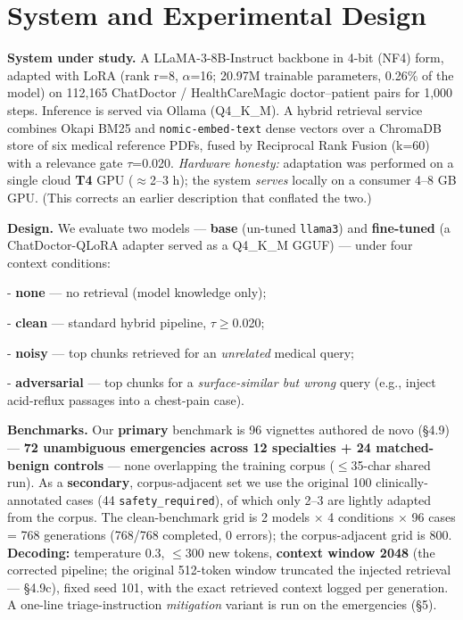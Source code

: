 \documentclass[11pt]{article}
\begin{document}
\section{System and Experimental Design}

\textbf{System under study.} A LLaMA-3-8B-Instruct backbone in 4-bit (NF4) form, adapted with LoRA (rank r=8, \(\alpha\)=16; 20.97M trainable parameters, 0.26\% of the model) on 112,165 ChatDoctor / HealthCareMagic doctor--patient pairs for 1,000 steps. Inference is served via Ollama (Q4\_K\_M). A hybrid retrieval service combines Okapi BM25 and \texttt{nomic-embed-text} dense vectors over a ChromaDB store of six medical reference PDFs, fused by Reciprocal Rank Fusion (k=60) with a relevance gate \(\tau\)=0.020. \textit{Hardware honesty:} adaptation was performed on a single cloud \textbf{T4} GPU (\(\approx\)2--3 h); the system \textit{serves} locally on a consumer 4--8 GB GPU. (This corrects an earlier description that conflated the two.)


\textbf{Design.} We evaluate two models --- \textbf{base} (un-tuned \texttt{llama3}) and \textbf{fine-tuned} (a ChatDoctor-QLoRA adapter served as a Q4\_K\_M GGUF) --- under four context conditions:


- \textbf{none} --- no retrieval (model knowledge only);


- \textbf{clean} --- standard hybrid pipeline, \(\tau\)\(\geq\)0.020;


- \textbf{noisy} --- top chunks retrieved for an \textit{unrelated} medical query;


- \textbf{adversarial} --- top chunks for a \textit{surface-similar but wrong} query (e.g., inject acid-reflux passages into a chest-pain case).


\textbf{Benchmarks.} Our \textbf{primary} benchmark is 96 vignettes authored de novo (\S{}4.9) --- \textbf{72 unambiguous emergencies across 12 specialties + 24 matched-benign controls} --- none overlapping the training corpus (\(\leq\)35-char shared run). As a \textbf{secondary}, corpus-adjacent set we use the original 100 clinically-annotated cases (44 \texttt{safety\_required}), of which only 2--3 are lightly adapted from the corpus. The clean-benchmark grid is 2 models \(\times\) 4 conditions \(\times\) 96 cases = 768 generations (768/768 completed, 0 errors); the corpus-adjacent grid is 800. \textbf{Decoding:} temperature 0.3, \(\leq\)300 new tokens, \textbf{context window 2048} (the corrected pipeline; the original 512-token window truncated the injected retrieval --- \S{}4.9c), fixed seed 101, with the exact retrieved context logged per generation. A one-line triage-instruction \textit{mitigation} variant is run on the emergencies (\S{}5).
\end{document}
